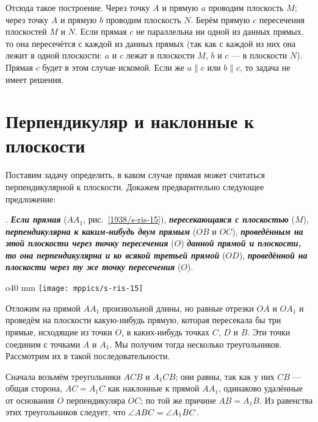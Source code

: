 Отсюда такое построение.
Через точку $A$ и прямую $a$ проводим плоскость $M$;
через точку $A$ и прямую $b$ проводим плоскость $N$.
Берём прямую $c$ пересечения плоскостей $M$ и $N$.
Если прямая $c$ не параллельна ни одной из данных прямых, то она пересечётся с каждой из данных прямых (так как с каждой из них она лежит в одной плоскости: $a$ и $c$ лежат в плоскости $M$, $b$ и $c$ — в плоскости $N$).
Прямая $c$ будет в этом случае искомой.
Если же $a\parallel c$ или $b\parallel c$, то задача не имеет решения.

\section{Перпендикуляр и наклонные к плоскости}

\paragraph{}\label{1938/s23}
Поставим задачу определить, в каком случае прямая может считаться перпендикулярной к плоскости.
Докажем предварительно следующее предложение:

\medskip

.
\textbf{\emph{Если прямая}} ($AA_1$, рис.~\ref{1938/s-ris-15}), \textbf{\emph{пересекающаяся с плоскостью}} ($M$), \textbf{\emph{перпендикулярна к каким-нибудь двум прямым}} ($OB$ и $OC$), \textbf{\emph{проведённым на этой плоскости через точку пересечения}} ($O$) \textbf{\emph{данной прямой и плоскости, то она перпендикулярна и ко всякой третьей прямой}} ($OD$), \textbf{\emph{проведённой на плоскости через ту же точку пересечения}} ($O$).

\begin{wrapfigure}{o}{40 mm}
\centering
\texttt{[image: mppics/s-ris-15]}
\caption{}\label{1938/s-ris-15}
\end{wrapfigure}

Отложим на прямой $AA_1$ произвольной длины, но равные отрезки $OA$ и $OA_1$ и проведём на плоскости какую-нибудь прямую, которая пересекала бы три прямые, исходящие из точки $O$, в каких-нибудь точках $C$, $D$ и $B$.
Эти точки соединим с точками $A$ и $A_1$.
Мы получим тогда несколько треугольников.
Рассмотрим их в такой последовательности.

Сначала возьмём треугольники $ACB$ и $A_1CB$;
они равны, так как у них $CB$ — общая сторона, $AC=A_1C$ как наклонные к прямой $AA_1$, одинаково удалённые от основания $O$ перпендикуляра $OC$;
по той же причине $AB=A_1B$.
Из равенства этих треугольников следует, что $\angle ABC\z=\angle A_1BC$.

